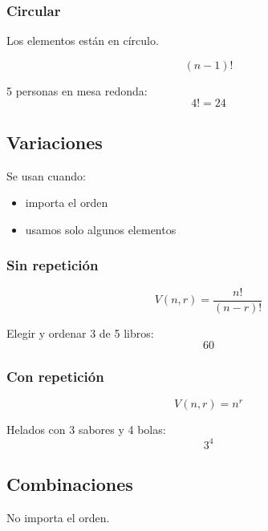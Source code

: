 \documentclass[12pt]{article}
\begin{document}
    \subsubsection*{Circular}
    \begin{idea}
        Los elementos están en círculo.
    \end{idea}

    \[
    (n-1)!
    \]

    \begin{ejemplo}
        5 personas en mesa redonda:
        \[
        4! = 24
        \]
    \end{ejemplo}

    \newpage
    \subsection{Variaciones}
    Se usan cuando:
    \begin{itemize}
        \item importa el orden
        \item usamos solo algunos elementos
    \end{itemize}

    \subsubsection*{Sin repetición}
    \[
    V(n,r) = \frac{n!}{(n-r)!}
    \]

    \begin{ejemplo}
        Elegir y ordenar 3 de 5 libros:
        \[
        60
        \]
    \end{ejemplo}

    \subsubsection*{Con repetición}
    \[
    V(n,r) = n^r
    \]

    \begin{ejemplo}
        Helados con 3 sabores y 4 bolas:
        \[
        3^4
        \]
    \end{ejemplo}

    \subsection{Combinaciones}
    \begin{idea}
        No importa el orden.
    \end{idea}
\end{document}
